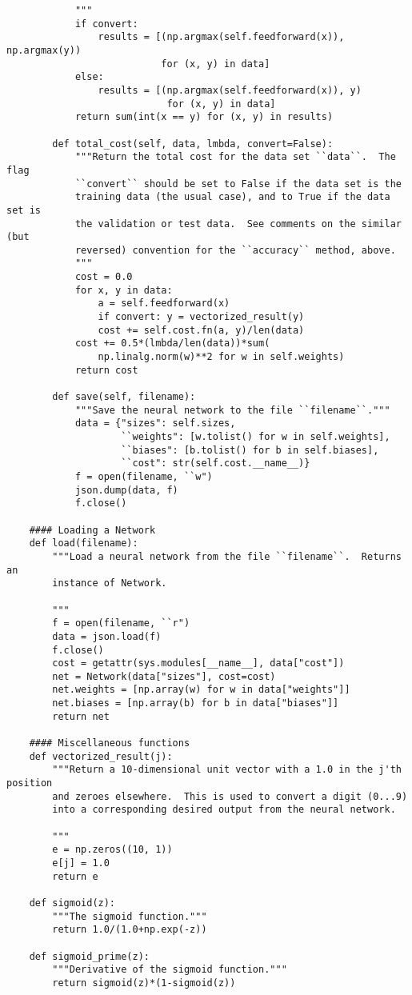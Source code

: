 \begin{lstlisting}
            """
            if convert:
                results = [(np.argmax(self.feedforward(x)), np.argmax(y))
                           for (x, y) in data]
            else:
                results = [(np.argmax(self.feedforward(x)), y)
                            for (x, y) in data]
            return sum(int(x == y) for (x, y) in results)
    
        def total_cost(self, data, lmbda, convert=False):
            """Return the total cost for the data set ``data``.  The flag
            ``convert`` should be set to False if the data set is the
            training data (the usual case), and to True if the data set is
            the validation or test data.  See comments on the similar (but
            reversed) convention for the ``accuracy`` method, above.
            """
            cost = 0.0
            for x, y in data:
                a = self.feedforward(x)
                if convert: y = vectorized_result(y)
                cost += self.cost.fn(a, y)/len(data)
            cost += 0.5*(lmbda/len(data))*sum(
                np.linalg.norm(w)**2 for w in self.weights)
            return cost
    
        def save(self, filename):
            """Save the neural network to the file ``filename``."""
            data = {"sizes": self.sizes,
                    ``weights": [w.tolist() for w in self.weights],
                    ``biases": [b.tolist() for b in self.biases],
                    ``cost": str(self.cost.__name__)}
            f = open(filename, ``w")
            json.dump(data, f)
            f.close()
    
    #### Loading a Network
    def load(filename):
        """Load a neural network from the file ``filename``.  Returns an
        instance of Network.
    
        """
        f = open(filename, ``r")
        data = json.load(f)
        f.close()
        cost = getattr(sys.modules[__name__], data["cost"])
        net = Network(data["sizes"], cost=cost)
        net.weights = [np.array(w) for w in data["weights"]]
        net.biases = [np.array(b) for b in data["biases"]]
        return net
    
    #### Miscellaneous functions
    def vectorized_result(j):
        """Return a 10-dimensional unit vector with a 1.0 in the j'th position
        and zeroes elsewhere.  This is used to convert a digit (0...9)
        into a corresponding desired output from the neural network.
    
        """
        e = np.zeros((10, 1))
        e[j] = 1.0
        return e
    
    def sigmoid(z):
        """The sigmoid function."""
        return 1.0/(1.0+np.exp(-z))
    
    def sigmoid_prime(z):
        """Derivative of the sigmoid function."""
        return sigmoid(z)*(1-sigmoid(z))
    
\end{lstlisting}

